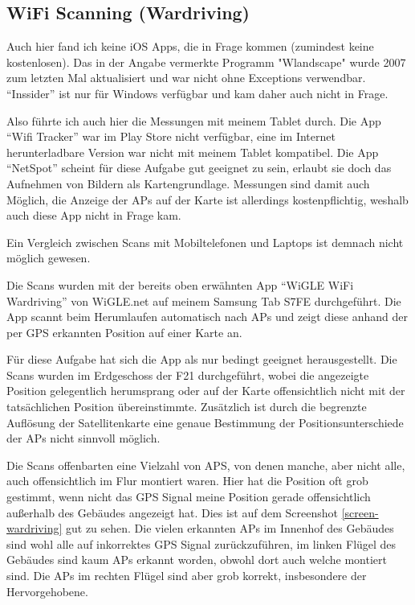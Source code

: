 \subsection{WiFi Scanning (Wardriving)}

Auch hier fand ich keine iOS Apps, die in Frage kommen (zumindest keine kostenlosen). Das in der Angabe vermerkte Programm "Wlandscape" wurde 2007 zum letzten Mal aktualisiert und war nicht ohne Exceptions verwendbar. \enquote{Inssider} ist nur für Windows verfügbar und kam daher auch nicht in Frage.

Also führte ich auch hier die Messungen mit meinem Tablet durch. Die App \enquote{Wifi Tracker} war im Play Store nicht verfügbar, eine im Internet herunterladbare Version war nicht mit meinem Tablet kompatibel. Die App \enquote{NetSpot} scheint für diese Aufgabe gut geeignet zu sein, erlaubt sie doch das Aufnehmen von Bildern als Kartengrundlage. Messungen sind damit auch Möglich, die Anzeige der APs auf der Karte ist allerdings kostenpflichtig, weshalb auch diese App nicht in Frage kam.

Ein Vergleich zwischen Scans mit Mobiltelefonen und Laptops ist demnach nicht möglich gewesen.

Die Scans wurden mit der bereits oben erwähnten App \enquote{WiGLE WiFi Wardriving} von WiGLE.net auf meinem Samsung Tab S7FE durchgeführt. Die App scannt beim Herumlaufen automatisch nach APs und zeigt diese anhand der per GPS erkannten Position auf einer Karte an.

Für diese Aufgabe hat sich die App als nur bedingt geeignet herausgestellt. Die Scans wurden im Erdgeschoss der F21 durchgeführt, wobei die angezeigte Position gelegentlich herumsprang oder auf der Karte offensichtlich nicht mit der tatsächlichen Position übereinstimmte. Zusätzlich ist durch die begrenzte Auflösung der Satellitenkarte eine genaue Bestimmung der Positionsunterschiede der APs nicht sinnvoll möglich.

Die Scans offenbarten eine Vielzahl von APS, von denen manche, aber nicht alle, auch offensichtlich im Flur montiert waren. Hier hat die Position oft grob gestimmt, wenn nicht das GPS Signal meine Position gerade offensichtlich außerhalb des Gebäudes angezeigt hat. Dies ist auf dem Screenshot \ref{screen-wardriving} gut zu sehen. Die vielen erkannten APs im Innenhof des Gebäudes sind wohl alle auf inkorrektes GPS Signal zurückzuführen, im linken Flügel des Gebäudes sind kaum APs erkannt worden, obwohl dort auch welche montiert sind. Die APs im rechten Flügel sind aber grob korrekt, insbesondere der Hervorgehobene.

